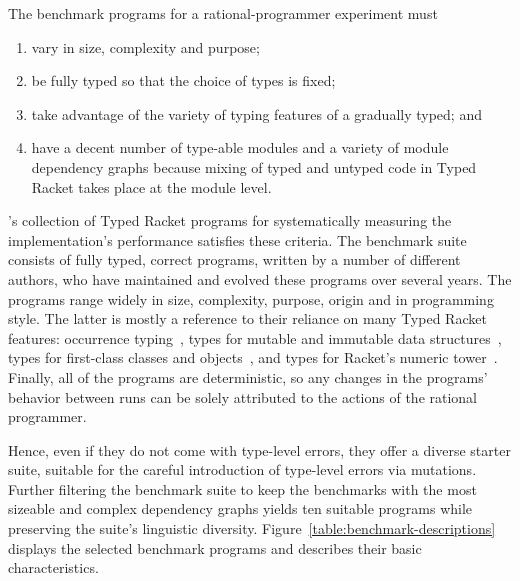 
The benchmark programs for a rational-programmer experiment must 
\begin{enumerate}
   
\item vary in size, complexity and purpose;

\item be fully typed so that the choice of types is fixed; 
    
\item take advantage of the variety of typing features of a gradually
typed; and

\item have a decent number of type-able modules and a variety of module dependency graphs
 because mixing of typed and untyped code in Typed Racket takes place at the
 module level. 

\end{enumerate}

\citet{gtnffvf-jfp-2019}'s collection of Typed Racket programs for
systematically measuring the implementation's performance satisfies these
criteria. The benchmark suite consists of fully typed, correct programs, written
by a number of different authors, who have maintained and evolved these programs
over several years. The programs range widely in size, complexity, purpose,
origin and in programming style. The latter is mostly a reference to their
reliance on many Typed Racket features: occurrence typing~\citep{tf-icfp-2010},
types for mutable and immutable data structures~\citep{hpst-sfp-2010}, types for
first-class classes and objects~\citep{tsdtf-oopsla-2012}, and types for
Racket's numeric tower~\citep{stathff-padl-12}.  Finally, all of the programs
are deterministic, so any changes in the programs' behavior between runs can be
solely attributed to the actions of the rational programmer.

Hence, even if they do not come with type-level errors, they offer a diverse
starter suite, suitable for the careful introduction of type-level errors via
mutations. Further filtering the benchmark suite to keep the benchmarks with the
most sizeable and complex dependency graphs yields ten suitable programs while
preserving the suite's linguistic diversity. Figure~\ref{table:benchmark-descriptions} displays the selected
benchmark programs and describes their basic characteristics.
